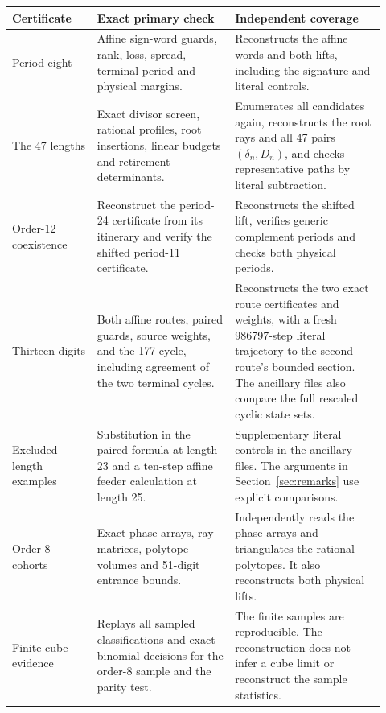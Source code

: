 \documentclass[11pt,reqno]{amsart}
\theoremstyle{remark}
\begin{document}
\begin{center}
\small
\begin{tabular}{@{}>{\raggedright\arraybackslash}p{0.21\linewidth}>{\raggedright\arraybackslash}p{0.34\linewidth}>{\raggedright\arraybackslash}p{0.37\linewidth}@{}}
\toprule
Certificate & Exact primary check & Independent coverage \\
\midrule
Period eight
& Affine sign-word guards, rank, loss, spread, terminal period
and physical margins.
& Reconstructs the affine words and both lifts,
including the signature and literal controls.\\[3pt]
The 47 lengths
& Exact divisor screen, rational profiles, root insertions,
linear budgets and retirement determinants.
& Enumerates all candidates again, reconstructs the
root rays and all 47 pairs \((\delta_n,D_n)\), and checks
representative paths by literal subtraction.\\[3pt]
Order-12 coexistence
& Reconstruct the period-24 certificate from its itinerary and
verify the shifted period-11 certificate.
& Reconstructs the shifted lift, verifies generic
complement periods and checks both physical periods.\\[3pt]
Thirteen digits
& Both affine routes, paired guards, source weights,
and the 177-cycle, including agreement of the two terminal cycles.
& Reconstructs the two exact route certificates and
weights, with a fresh 986797-step literal trajectory to the
second route's bounded section. The ancillary files also compare the
full rescaled cyclic state sets.\\[3pt]
Excluded-length examples
& Substitution in the paired formula at length 23 and a
ten-step affine feeder calculation at length 25.
& Supplementary literal controls in the ancillary files. The arguments
in Section~\ref{sec:remarks} use explicit comparisons.\\[3pt]
Order-8 cohorts
& Exact phase arrays, ray matrices, polytope volumes and
51-digit entrance bounds.
& Independently reads the phase arrays and triangulates
the rational polytopes. It also reconstructs both physical lifts.\\[3pt]
Finite cube evidence
& Replays all sampled classifications and exact binomial
decisions for the order-8 sample and the parity test.
& The finite samples are reproducible. The reconstruction does not infer a
cube limit or reconstruct the sample statistics.\\
\bottomrule
\end{tabular}
\end{center}
\end{document}
